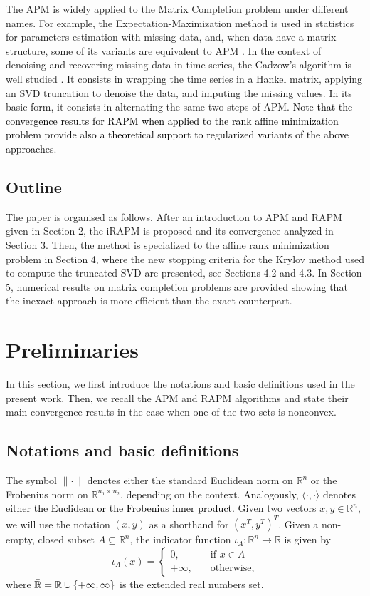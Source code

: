 \documentclass[pdflatex,sn-mathphys-num]{sn-jnl}
\numberwithin{equation}{section}%
\def\R{\mathbb{R}}
\def\bR{\bar{\mathbb{R}}}
\newcommand{\REV}[1]{\textcolor{black}{#1}}
\theoremstyle{thmstyleone}%
\theoremstyle{thmstyletwo}%
\theoremstyle{thmstylethree}%
\begin{document}
The APM is widely applied to the Matrix Completion problem under different names. For example, the Expectation-Maximization method is used in statistics for parameters estimation with missing data, and,  when data have a matrix structure, some of its variants are equivalent to APM \cite{guerreiro2003estimation}. In the context of denoising and recovering missing data in time series, the Cadzow's algorithm is well studied \cite{wang2021fast}. It consists in wrapping the time series in a Hankel matrix, applying an SVD truncation to denoise the data, and imputing the missing values.  In its basic form, it consists in alternating the same two steps of APM. \REV{Note that the convergence results for RAPM when applied to the rank affine minimization problem provide also a theoretical support to regularized variants of the above approaches.}

\subsection{Outline}
The paper is organised as follows.
After an introduction to APM and RAPM given in Section 2, the iRAPM is proposed and its convergence analyzed in Section 3. Then, the method is specialized to the affine rank minimization problem in Section 4, where the new stopping criteria for the Krylov method used to compute the truncated SVD are presented, see Sections 4.2 and 4.3. In Section 5, numerical results on matrix completion problems are provided showing that the inexact approach is more efficient than the exact counterpart. 

\section{Preliminaries}

In this section, we first introduce the notations and basic definitions used in the present work. Then, we recall the APM and RAPM algorithms and state their main convergence results in the case when one of the two sets is nonconvex.

\subsection{Notations and basic definitions} 
The symbol $\|\cdot\|$ denotes either the standard Euclidean norm on $\R^n$ or the Frobenius norm on $\R^{n_1\times n_2}$, depending on the context.  \REV{Analogously, $\langle \cdot,\cdot\rangle $ denotes either the Euclidean or the Frobenius inner product}.
Given two vectors $x,y \in \R^n$, we will use the notation $(x,y)$ as a shorthand for $(x^T,y^T)^T$. Given a non-empty, closed subset $A\subseteq \R^n$, the indicator function $\iota_A:\R^n\rightarrow \bR$ is given by
\begin{equation*}
    \iota_{A}(x)=\begin{cases}0, \quad &\text{if }x\in A\\
    +\infty, \quad &\text{otherwise},
    \end{cases}
\end{equation*}
where $\bR=\R\cup \{+\infty,\-\infty\}$ is the extended real numbers set.
\end{document}

